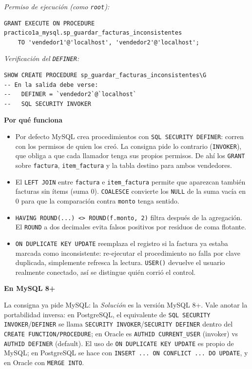 \documentclass[11pt,a4paper]{article}
\newcommand{\itemcabecera}[1]{\noindent\textbf{#1}\par\medskip}
\newcommand{\bloquePorque}{\itemcabecera{Por qu\'e funciona}}
\newcommand{\bloqueMySQL}{\itemcabecera{En MySQL 8+}}
\begin{document}
\textit{Permiso de ejecución (como \texttt{root}):}

\begin{lstlisting}
GRANT EXECUTE ON PROCEDURE practico1a_mysql.sp_guardar_facturas_inconsistentes
    TO 'vendedor1'@'localhost', 'vendedor2'@'localhost';
\end{lstlisting}

\textit{Verificación del \texttt{DEFINER}:}

\begin{lstlisting}
SHOW CREATE PROCEDURE sp_guardar_facturas_inconsistentes\G
-- En la salida debe verse:
--   DEFINER = `vendedor2`@`localhost`
--   SQL SECURITY INVOKER
\end{lstlisting}

\bloquePorque

\begin{itemize}
    \item Por defecto MySQL crea procedimientos con \texttt{SQL SECURITY DEFINER}: corren con los permisos de quien los creó. La consigna pide lo contrario (\texttt{INVOKER}), que obliga a que cada llamador tenga sus propios permisos. De ahí los \texttt{GRANT} sobre \texttt{factura}, \texttt{item\_factura} y la tabla destino para ambos vendedores.
    \item El \texttt{LEFT JOIN} entre \texttt{factura} e \texttt{item\_factura} permite que aparezcan también facturas sin ítems (suma 0). \texttt{COALESCE} convierte los \texttt{NULL} de la suma vacía en 0 para que la comparación contra \texttt{monto} tenga sentido.
    \item \texttt{HAVING ROUND(...) <> ROUND(f.monto, 2)} filtra después de la agregación. El \texttt{ROUND} a dos decimales evita falsos positivos por residuos de coma flotante.
    \item \texttt{ON DUPLICATE KEY UPDATE} reemplaza el registro si la factura ya estaba marcada como inconsistente: re-ejecutar el procedimiento no falla por clave duplicada, simplemente refresca la lectura. \texttt{USER()} devuelve el usuario realmente conectado, así se distingue quién corrió el control.
\end{itemize}

\bloqueMySQL

La consigna ya pide MySQL: la \textit{Solución} es la versión MySQL 8+. Vale anotar la portabilidad inversa: en PostgreSQL, el equivalente de \texttt{SQL SECURITY INVOKER}/\texttt{DEFINER} se llama \texttt{SECURITY INVOKER}/\texttt{SECURITY DEFINER} dentro del \texttt{CREATE FUNCTION/PROCEDURE}; en Oracle es \texttt{AUTHID CURRENT\_USER} (invoker) vs \texttt{AUTHID DEFINER} (default). El uso de \texttt{ON DUPLICATE KEY UPDATE} es propio de MySQL; en PostgreSQL se hace con \texttt{INSERT ... ON CONFLICT ... DO UPDATE}, y en Oracle con \texttt{MERGE INTO}.
\end{document}
